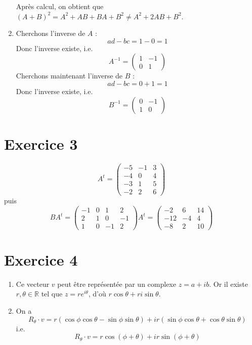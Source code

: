 \documentclass[a4paper, titlepage]{article}
\begin{document}
\begin{enumerate}
			Après calcul, on obtient que $(A+B)^2 = A^2+AB+BA+B^2 \neq A^2+2AB+B^2$.
		\item Cherchons l'inverse de $A$ :
			$$ ad-bc = 1-0 = 1 $$
			Donc l'inverse existe, i.e.
			$$ A^{-1} = \begin{pmatrix} 1&-1\\0&1 \end{pmatrix}  $$
			Cherchons maintenant l'inverse de $B$ :
			$$ ad-bc = 0+1 = 1 $$
			Donc l'inverse existe, i.e.
			$$ B^{-1} = \begin{pmatrix} 0&-1\\1&0 \end{pmatrix}  $$
	\end{enumerate}
	\section*{Exercice 3}
	$$ A^t = \begin{pmatrix} -5&-1&3\\-4&0&4\\-3&1&5\\-2&2&6 \end{pmatrix}  $$
	puis
	$$ BA^t = \begin{pmatrix} -1&0&1&2\\ 2&1&0&-1\\ 1&0&-1&2 \end{pmatrix}A^t = \begin{pmatrix} -2&6&14\\-12&-4&4\\-8&2&10 \end{pmatrix}   $$
	\section*{Exercice 4}
	\begin{enumerate}
		\item Ce vecteur $v$ peut être représentée par un complexe $z=a+ib$. Or il existe $r,\theta\in\mathbb{R}$ tel que $z=re^{i\theta}$, d'où $r\cos\theta+ri\sin\theta$.
		\item On a 
			$$ R_{\theta}\cdot v = r(\cos\phi\cos\theta-\sin\phi\sin\theta)+ir(\sin\phi\cos\theta+\cos\theta\sin\theta) $$
			i.e.
			$$ R_{\theta}\cdot v = r\cos(\phi+\theta)+ir\sin(\phi+\theta) $$
	\end{enumerate}
\end{document}
